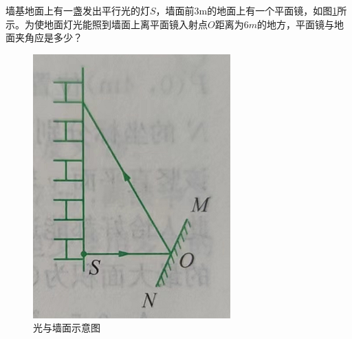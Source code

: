 \documentclass[windows,csize4]{BHCexam}
\begin{document}
\begin{groups}
\begin{questions}[]
        \question[5] 墙基地面上有一盏发出平行光的灯$S$，墙面前3m的地面上有一个平面镜，如图\ref{fig:fig_3_12}所示。为使地面灯光能照到墙面上离平面镜入射点$O$距离为$6m$的地方，平面镜与地面夹角应是多少？
        \begin{figure}[htb]
            \centering
            \includegraphics [scale=0.5,trim=0 0 0 0]{./image/fig_3_12.PNG}
            \caption{光与墙面示意图}
            \label{fig:fig_3_12}
        \end{figure}
        \vspace{3cm}


\end{questions}
\end{groups}
\end{document}
